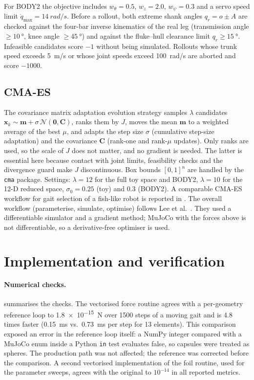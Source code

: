 For BODY2 the objective includes $w_\theta=0.5$, $w_z=2.0$, $w_\psi=0.3$ and a servo
speed limit $\dot q_{\max}=\SI{14}{rad/s}$. Before a rollout, both extreme shank angles
$q_r=o\pm A$ are checked against the four-bar inverse kinematics of the real leg
(transmission angle $\ge\SI{10}{\degree}$, knee angle $\ge\SI{45}{\degree}$) and against
the fluke--hull clearance limit $q_r\ge\SI{15}{\degree}$. Infeasible candidates score
$-1$ without being simulated. Rollouts whose trunk speed exceeds \SI{5}{m/s} or whose
joint speeds exceed \SI{100}{rad/s} are aborted and score $-1000$.

\subsection{CMA-ES}
The covariance matrix adaptation evolution strategy \cite{Hansen2001,Hansen2016}
samples $\lambda$ candidates $\bm x_k\sim\bm m+\sigma\,\mathcal N(\bm 0,\bm C)$, ranks them
by $J$, moves the mean $\bm m$ to a weighted average of the best $\mu$, and adapts the
step size $\sigma$ (cumulative step-size adaptation) and the covariance $\bm C$ (rank-one
and rank-$\mu$ updates). Only ranks are used, so the scale of $J$ does not matter, and
no gradient is needed. The latter is essential here because contact with joint limits,
feasibility checks and the divergence guard make $J$ discontinuous. Box bounds
$[0,1]^n$ are handled by the \texttt{cma} package. Settings: $\lambda=12$ for the full
toy space and BODY2, $\lambda=10$ for the 12-D reduced space, $\sigma_0=0.25$ (toy) and
$0.3$ (BODY2). A comparable CMA-ES workflow for gait selection of a fish-like robot
is reported in \cite{FishCMAES2021}. The overall workflow (parameterise, simulate,
optimise) follows Lee et al.\ \cite{Lee2025}. They used a differentiable simulator and a
gradient method; MuJoCo with the forces above is not differentiable, so a
derivative-free optimiser is used.

\section{Implementation and verification}
\label{sec:mj-verify}

\paragraph{Numerical checks.}
 summarises the checks. The vectorised force routine agrees with a
per-geometry reference loop to \SI{1.8e-15}{N} over 1500 steps of a moving gait and is
4.8 times faster (\SI{0.15}{ms} vs.\ \SI{0.73}{ms} per step for 13 elements). This
comparison exposed an error in the reference loop itself: a NumPy integer compared
with a MuJoCo enum inside a Python \texttt{in} test evaluates false, so capsules were
treated as spheres. The production path was not affected; the reference was corrected
before the comparison. A second vectorised implementation of the foil routine, used for
the parameter sweeps, agrees with the original to $10^{-14}$ in all reported metrics.

